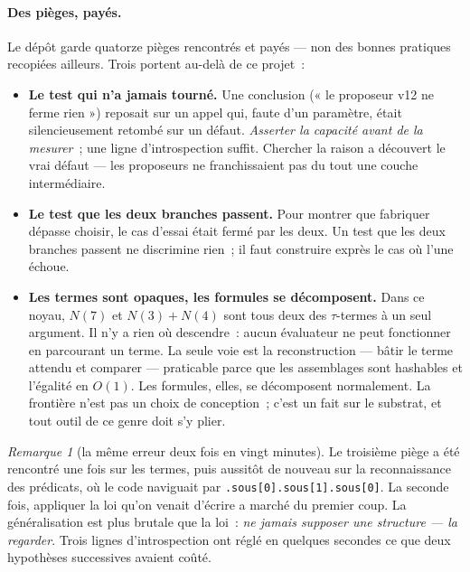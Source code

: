 \documentclass[11pt]{article}
\theoremstyle{remark}\newtheorem{remarque}{Remarque}
\begin{document}
\paragraph{Des pièges, payés.} Le dépôt garde quatorze pièges rencontrés et payés --- non
des bonnes pratiques recopiées ailleurs. Trois portent au-delà de ce projet~:

\begin{itemize}\itemsep2pt
\item \textbf{Le test qui n'a jamais tourné.} Une conclusion (« le proposeur v12 ne ferme
rien ») reposait sur un appel qui, faute d'un paramètre, était silencieusement retombé
sur un défaut. \emph{Asserter la capacité avant de la mesurer}~; une ligne
d'introspection suffit. Chercher la raison a découvert le vrai défaut --- les proposeurs
ne franchissaient pas du tout une couche intermédiaire.
\item \textbf{Le test que les deux branches passent.} Pour montrer que fabriquer dépasse
choisir, le cas d'essai était fermé par les deux. Un test que les deux branches passent
ne discrimine rien~; il faut construire exprès le cas où l'une échoue.
\item \textbf{Les termes sont opaques, les formules se décomposent.} Dans ce noyau,
$N(7)$ et $N(3)+N(4)$ sont tous deux des $\tau$-termes à un seul argument. Il n'y a rien
où descendre~: aucun évaluateur ne peut fonctionner en parcourant un terme. La seule voie
est la reconstruction --- bâtir le terme attendu et comparer --- praticable parce que les
assemblages sont hashables et l'égalité en $O(1)$. Les formules, elles, se décomposent
normalement. La frontière n'est pas un choix de conception~; c'est un fait sur le
substrat, et tout outil de ce genre doit s'y plier.
\end{itemize}

\begin{remarque}[la même erreur deux fois en vingt minutes]
Le troisième piège a été rencontré une fois sur les termes, puis aussitôt de nouveau sur
la reconnaissance des prédicats, où le code naviguait par
\texttt{.sous[0].sous[1].sous[0]}. La seconde fois, appliquer la loi qu'on venait
d'écrire a marché du premier coup. La généralisation est plus brutale que la loi~:
\emph{ne jamais supposer une structure --- la regarder}. Trois lignes d'introspection ont
réglé en quelques secondes ce que deux hypothèses successives avaient coûté.
\end{remarque}

\end{document}
